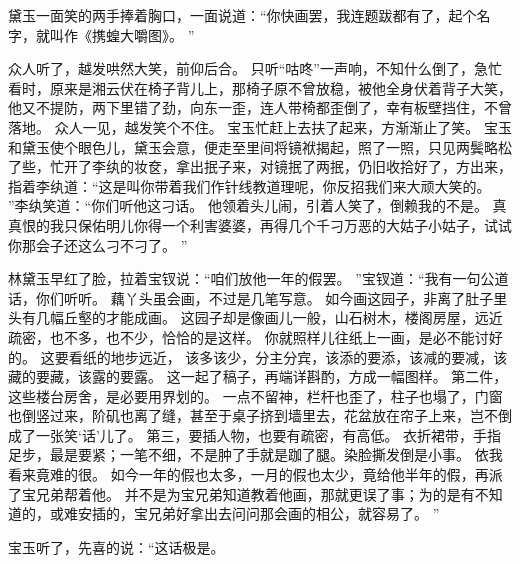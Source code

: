 黛玉一面笑的两手捧着胸口，一面说道：“你快画罢，我连题跋都有了，起个名字，就叫作《携蝗大嚼图》。
”\par
{}
众人听了，越发哄然大笑，前仰后合。
只听“咕咚”一声响，不知什么倒了，急忙看时，原来是湘云伏在椅子背儿上，那椅子原不曾放稳，被他全身伏着背子大笑，他又不提防，两下里错了劲，向东一歪，连人带椅都歪倒了，幸有板壁挡住，不曾落地。
众人一见，越发笑个不住。
宝玉忙赶上去扶了起来，方渐渐止了笑。
宝玉和黛玉使个眼色儿，黛玉会意，便走至里间将镜袱揭起，照了一照，只见两鬓略松了些，忙开了李纨的妆奁，拿出抿子来，对镜抿了两抿，仍旧收拾好了，方出来，指着李纨道：“这是叫你带着我们作针线教道理呢，你反招我们来大顽大笑的。
”李纨笑道：“你们听他这刁话。
他领着头儿闹，引着人笑了，倒赖我的不是。
真真恨的我只保佑明儿你得一个利害婆婆，再得几个千刁万恶的大姑子小姑子，试试你那会子还这么刁不刁了。
”\par
林黛玉早红了脸，拉着宝钗说：“咱们放他一年的假罢。
”宝钗道：“我有一句公道话，你们听听。
藕丫头虽会画，不过是几笔写意。
如今画这园子，非离了肚子里头有几幅丘壑的才能成画。
这园子却是像画儿一般，山石树木，楼阁房屋，远近疏密，也不多，也不少，恰恰的是这样。
你就照样儿往纸上一画，是必不能讨好的。
这要看纸的地步远近，
该多该少，分主分宾，该添的要添，该减的要减，该藏的要藏，该露的要露。
这一起了稿子，再端详斟酌，方成一幅图样。
第二件，这些楼台房舍，是必要用界划的。
一点不留神，栏杆也歪了，柱子也塌了，门窗也倒竖过来，阶矶也离了缝，甚至于桌子挤到墙里去，花盆放在帘子上来，岂不倒成了一张笑‘话’儿了。
第三，要插人物，也要有疏密，有高低。
衣折裙带，手指足步，最是要紧；一笔不细，不是肿了手就是跏了腿。染脸撕发倒是小事。
依我看来竟难的很。
如今一年的假也太多，一月的假也太少，竟给他半年的假，再派了宝兄弟帮着他。
并不是为宝兄弟知道教着他画，那就更误了事；为的是有不知道的，或难安插的，宝兄弟好拿出去问问那会画的相公，就容易了。
”\par
宝玉听了，先喜的说：“这话极是。

